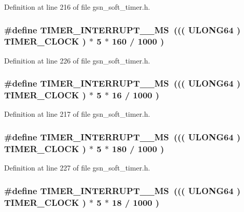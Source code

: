 Definition at line 216 of file gsn\_\-soft\_\-timer.h.

\hypertarget{a00673_ga1d84a0363d80e46ecec3bf811837242b}{
\subsubsection[{TIMER\_\-INTERRUPT\_\-800\_\-MS}]{\setlength{\rightskip}{0pt plus 5cm}\#define TIMER\_\-INTERRUPT\_\_\-MS~((( {\bf ULONG64} ) TIMER\_\-CLOCK ) $\ast$ 5 $\ast$ 160 / 1000 )}}
\label{a00673_ga1d84a0363d80e46ecec3bf811837242b}


Definition at line 226 of file gsn\_\-soft\_\-timer.h.

\hypertarget{a00673_ga363db70188865e3d222337dfd68cd5f1}{
\subsubsection[{TIMER\_\-INTERRUPT\_\-80\_\-MS}]{\setlength{\rightskip}{0pt plus 5cm}\#define TIMER\_\-INTERRUPT\_\_\-MS~((( {\bf ULONG64} ) TIMER\_\-CLOCK ) $\ast$ 5 $\ast$ 16 / 1000 )}}
\label{a00673_ga363db70188865e3d222337dfd68cd5f1}


Definition at line 217 of file gsn\_\-soft\_\-timer.h.

\hypertarget{a00673_gadb278155a97d15ad4ac348c292c9b60f}{
\subsubsection[{TIMER\_\-INTERRUPT\_\-900\_\-MS}]{\setlength{\rightskip}{0pt plus 5cm}\#define TIMER\_\-INTERRUPT\_\_\-MS~((( {\bf ULONG64} ) TIMER\_\-CLOCK ) $\ast$ 5 $\ast$ 180 / 1000 )}}
\label{a00673_gadb278155a97d15ad4ac348c292c9b60f}


Definition at line 227 of file gsn\_\-soft\_\-timer.h.

\hypertarget{a00673_ga2cd73fada37ee4d173af1cb7dda9eca8}{
\subsubsection[{TIMER\_\-INTERRUPT\_\-90\_\-MS}]{\setlength{\rightskip}{0pt plus 5cm}\#define TIMER\_\-INTERRUPT\_\_\-MS~((( {\bf ULONG64} ) TIMER\_\-CLOCK ) $\ast$ 5 $\ast$ 18 / 1000 )}}
\label{a00673_ga2cd73fada37ee4d173af1cb7dda9eca8}


